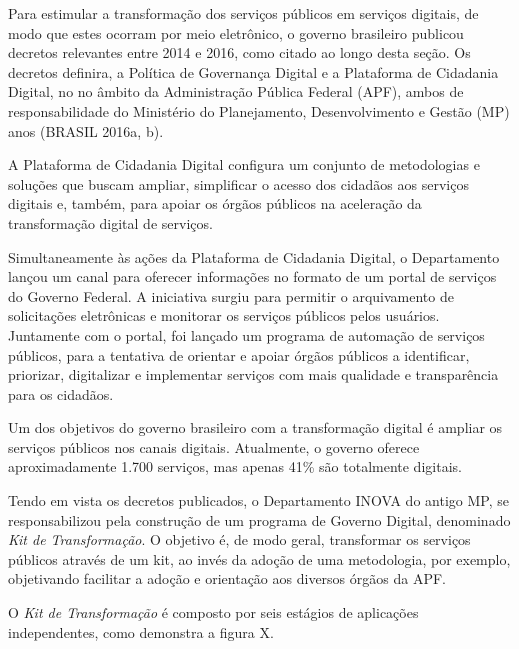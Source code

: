 Para estimular a transformação dos serviços públicos em serviços digitais, de modo que estes ocorram por meio eletrônico, o governo
brasileiro publicou decretos relevantes entre 2014 e 2016, como citado ao longo desta seção. Os decretos definira, a Política de Governança
Digital e a Plataforma de Cidadania Digital, no no âmbito da Administração Pública Federal (APF), ambos de responsabilidade do 
Ministério do Planejamento, Desenvolvimento e Gestão (MP) anos (BRASIL 2016a, b). 

A Plataforma de Cidadania Digital configura um conjunto de metodologias e soluções que buscam ampliar, simplificar o acesso dos
cidadãos aos serviços digitais e, também, para apoiar os órgãos públicos na aceleração da transformação digital de serviços. 

Simultaneamente às ações da Plataforma de Cidadania Digital, o Departamento lançou um canal para oferecer informações no
formato de um  portal de serviços do Governo Federal. A iniciativa surgiu para permitir o arquivamento de solicitações eletrônicas 
e monitorar os serviços públicos pelos usuários. Juntamente com o portal, foi lançado um programa de automação de serviços 
públicos, para a tentativa de orientar e apoiar órgãos públicos a identificar, priorizar, digitalizar e implementar serviços 
com mais qualidade e transparência para os cidadãos.

Um dos objetivos do governo brasileiro com a transformação digital é ampliar os serviços públicos nos canais digitais. 
Atualmente, o governo oferece aproximadamente 1.700 serviços, mas apenas 41\% são totalmente digitais.

Tendo em vista os decretos publicados, o Departamento INOVA do antigo MP, se responsabilizou pela construção
de um programa de Governo Digital, denominado \textit{Kit de Transformação}. O objetivo é, de modo geral, transformar os serviços públicos através de um kit,
ao invés da adoção de uma metodologia, por exemplo, objetivando facilitar a adoção e orientação aos diversos órgãos da APF.

O \textit{Kit de Transformação} é composto por seis estágios de aplicações independentes, como demonstra a figura X.


